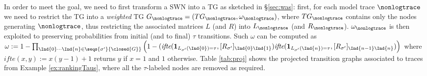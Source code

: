 In order to meet the goal, we need to first transform a SWN into a TG as sketched in \S\ref{sec:was}: first, for each model trace $\nonlogtrace$ we need to restrict the TG into a \textit{weighted} TG $G_\nonlogtrace=(TG_{\nonlogtrace},\omega_\nonlogtrace)$, where $TG_{\nonlogtrace}$ contains only the nodes generating $\nonlogtrace$, thus restricting the associated matrices $L$ (and $R$) into $L_\nonlogtrace$ (and $R_\nonlogtrace$). $\omega_\nonlogtrace$ is then exploited to preserving probabilities from initial (and to final) $\tau$ transitions. Such $\omega$ can be computed as $\omega := 1-\prod_{\Ind{0}\cdots\Ind{n}\in\seqs{\sigma'}{ \closed{G}}}\Big(1-(\textit{ifte}(\mathbf{1}_{L_{\sigma'}(\Ind{0})=\tau},[R_{\sigma'}]_{\Ind{0}\Ind{1}})\textit{ifte}(\mathbf{1}_{L_{\sigma'}(\Ind{n})=\tau},[R_{\sigma'}]_{\Ind{n-1}\Ind{n}})\Big)$
where $\textit{ifte}(x,y):=x(y-1)+1$ returns $y$ if $x=1$ and $1$ otherwise. %
Table \ref{tab:proj} shows the projected transition graphs associated to  traces from Example \ref{ex:rankingTaus}, where  all the $\tau$-labeled nodes are removed as required.
%	
%
%
